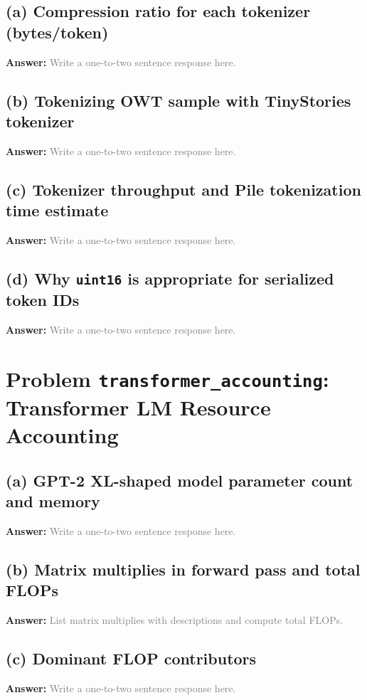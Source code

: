 \documentclass[11pt]{article}
\newcommand{\answer}{\textbf{Answer:} \vspace{1.5em}}
\newcommand{\placeholder}[1]{\textcolor{gray}{#1}}
\begin{document}
\subsection*{(a) Compression ratio for each tokenizer (bytes/token)}
\answer
\placeholder{Write a one-to-two sentence response here.}

\subsection*{(b) Tokenizing OWT sample with TinyStories tokenizer}
\answer
\placeholder{Write a one-to-two sentence response here.}

\subsection*{(c) Tokenizer throughput and Pile tokenization time estimate}
\answer
\placeholder{Write a one-to-two sentence response here.}

\subsection*{(d) Why \texttt{uint16} is appropriate for serialized token IDs}
\answer
\placeholder{Write a one-to-two sentence response here.}

\section{Problem \texttt{transformer\_accounting}: Transformer LM Resource Accounting}
\subsection*{(a) GPT-2 XL-shaped model parameter count and memory}
\answer
\placeholder{Write a one-to-two sentence response here.}

\subsection*{(b) Matrix multiplies in forward pass and total FLOPs}
\answer
\placeholder{List matrix multiplies with descriptions and compute total FLOPs.}

\subsection*{(c) Dominant FLOP contributors}
\answer
\placeholder{Write a one-to-two sentence response here.}
\end{document}
